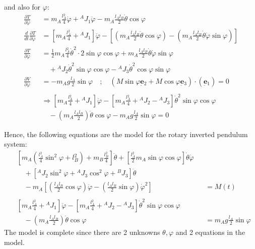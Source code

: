 \documentclass[12pt]{article}
\newcommand{\vb}[1]{{\underset{\tilde{}}{\mathbf{#1}}}}
\begin{document}
 and also for $\varphi$: 
\begin{align*}
    \frac{\partial T}{\partial \dot{\varphi}} &= m{}_A \frac{l{}_A^2}{4} \dot{\varphi} + {}^A J{}_1 \dot{\varphi} - m{}_A \frac{l{}_A l{}_B}{2} \dot{\theta} \cos\varphi\\
    \frac{d}{dt}\frac{\partial T}{\partial \dot{\varphi}} &= \left[ m{}_A \frac{l{}_A^2}{4} + {}^A J{}_1 \right] \ddot{\varphi} - \left[ \left( m{}_A \frac{l{}_A l{}_B}{2} \ddot{\theta} \cos\varphi \right) - \left( m{}_A \frac{l{}_A l{}_B}{2} \dot{\theta}\dot{\varphi} \sin\varphi \right) \right] \\
    \frac{\partial T}{\partial \varphi} &= \frac{1}{2} m{}_A \frac{l{}_A^2}{4} \dot{\theta}^2 \cdot 2\sin\varphi\cos\varphi + m{}_A \frac{l{}_A l{}_B}{2} \dot{\theta}\dot{\varphi}\sin\varphi \\
    &\quad + {}^A J{}_2 \dot{\theta}^2 \sin\varphi\cos\varphi - {}^A J{}_3 \dot{\theta}^2 \cos\varphi\sin\varphi \\
    \frac{\partial V}{\partial \varphi} &= -m{}_A g \frac{l{}_A}{2} \sin\varphi \quad; \quad(M\sin\varphi \vb{e}{}_2 + M\cos\varphi \vb{e}{}_3) \cdot (\vb{e}{}_1) = 0\\
    \\
    &\Rightarrow \left[ m{}_A \frac{l{}_A^2}{4} + {}^A J{}_1 \right] \ddot{\varphi} - \left[ m{}_A \frac{l{}_A^2}{4} + {}^A J{}_2 - {}^A J{}_3 \right] \dot{\theta}^2\sin\varphi\cos\varphi \\ &\quad - \left( m{}_A \frac{l{}_A l{}_B}{2} \right) \ddot{\theta} \cos\varphi - m{}_A g \frac{l{}_A}{2} \sin\varphi = 0
\end{align*}

 Hence, the following equations are the model for the rotary inverted pendulum system:
\begin{equation}
    \begin{aligned}
    &\left[ m{}_A \left(\frac{l{}_A^2}{4}\sin^2\varphi + l{}_B^2\right) + m{}_B \frac{l{}_B^2}{4} \right] \ddot{\theta} + \left[ \frac{l{}_A^2}{2} m{}_A \sin\varphi\cos\varphi \right] \dot{\theta}\dot{\varphi} \\
    &\quad + \left[ {}^A J{}_2 \sin^2\varphi + {}^A J{}_3 \cos^2\varphi + {}^B J{}_3 \right]\ddot{\theta} \\
    &\quad - m{}_A \left[ \left(\frac{l{}_A l{}_B}{2}\cos\varphi\right)\ddot{\varphi} - \left(\frac{l{}_A l{}_B}{2}\sin\varphi\right)\dot{\varphi}^2 \right] & &= M(t) \\
    \\
    &\left[ m{}_A \frac{l{}_A^2}{4} + {}^A J{}_1 \right] \ddot{\varphi} - \left[ m{}_A \frac{l{}_A^2}{4} + {}^A J{}_2 - {}^A J{}_3 \right] \dot{\theta}^2\sin\varphi\cos\varphi \\ &\quad - \left(m{}_A \frac{l{}_A l{}_B}{2}\right)\ddot{\theta}\cos\varphi & &=  m{}_A g \frac{l{}_A}{2} \sin\varphi
\end{aligned} 
\label{eq:eom}
\end{equation}
The model is complete since there are 2 unknowns $\theta, \varphi$ and 2 equations in the model. 
\end{document}
